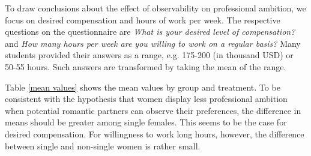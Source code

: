 \documentclass[aodsor,preprint]{imsart}
\numberwithin{equation}{section}
\theoremstyle{plain}
\begin{document}
\begin{table}[!htbp] \centering \renewcommand*{\arraystretch}{1.1}\caption{Summary Statistics}\label{SumStats}
\end{table}

To draw conclusions about the effect of observability on professional ambition, we focus on desired compensation and hours of work per week. The respective questions on the questionnaire are \textit{What is your desired level of compensation?} and \textit{How many hours per week are you willing to work on a regular basis?} Many students provided their answers as a range, e.g. 175-200 (in thousand USD) or 50-55 hours. Such answers are transformed by taking the mean of the range.

Table \ref{mean values} shows the mean values by group and treatment. To be consistent with the hypothesis that women display less professional ambition when potential romantic partners can observe their preferences, the difference in means should be greater among single females. This seems to be the case for desired compensation. For willingness to work long hours, however, the difference between single and non-single women is rather small. 
\end{document}
